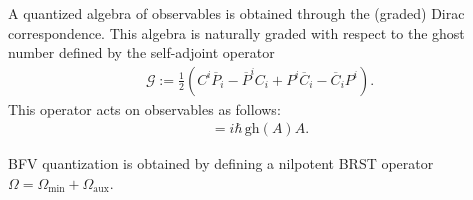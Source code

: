     A quantized algebra of observables is obtained through the (graded) Dirac correspondence. This algebra is naturally graded with respect to the ghost number defined by the self-adjoint operator
    \begin{gather}
        \mathcal{G} := \frac{1}{2}\left(C^i\overline{P}_i - \overline{P}^iC_i + P^i\overline{C}_i - \overline{C}_iP^i\right).
    \end{gather}
    This operator acts on observables as follows:
    \begin{gather}
        [\mathcal{G},A] = i\hbar\,\text{gh}(A)A.
    \end{gather}

    BFV quantization is obtained by defining a nilpotent BRST operator $\Omega=\Omega_{\text{min}}+\Omega_{\text{aux}}$.